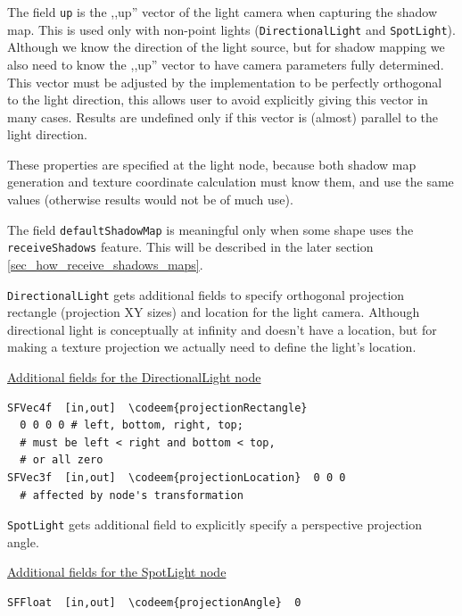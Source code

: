 \documentclass{acmsiggraph}                     %
\newenvironment{mycode}
{\begin{mycodecore}}
{\end{mycodecore}
\vspace{-0.1in}}
\newcommand*{\codeem}[1]{\textbf{#1}}
\begin{document}
The field \texttt{up} is the ,,up'' vector of the light camera when capturing
the shadow map. This is used only with non-point lights
(\texttt{DirectionalLight} and \texttt{SpotLight}).
Although we know the direction of the light source,
but for shadow mapping we also need to know the ,,up'' vector to have camera
parameters fully determined.
This vector must be adjusted by the implementation to be perfectly orthogonal
to the light direction, this allows user to avoid explicitly giving
this vector in many cases. Results are undefined only if this vector
is (almost) parallel to the light direction.

These properties are specified at the light node, because both
shadow map generation and texture coordinate calculation must know them,
and use the same values (otherwise results would not be of much use).

The field \texttt{defaultShadowMap} is meaningful only when some
shape uses the \texttt{receiveShadows} feature. This will be described
in the later section \ref{sec_how_receive_shadows_maps}.

\texttt{DirectionalLight} gets additional fields to specify orthogonal
projection rectangle (projection XY sizes) and location for
the light camera. Although directional light is conceptually at infinity
and doesn't have a location, but for making a texture projection
we actually need to define the light's location.

\begin{mycode}
\underline{Additional fields for the DirectionalLight node}
\begin{Verbatim}[commandchars=\\\{\}]
SFVec4f  [in,out]  \codeem{projectionRectangle}
  0 0 0 0 # left, bottom, right, top;
  # must be left < right and bottom < top,
  # or all zero
SFVec3f  [in,out]  \codeem{projectionLocation}  0 0 0
  # affected by node's transformation
\end{Verbatim}
\end{mycode}

\needspace{1in}
\texttt{SpotLight} gets additional field to explicitly specify a perspective
projection angle.

\begin{mycode}
\underline{Additional fields for the SpotLight node}
\begin{Verbatim}[commandchars=\\\{\}]
SFFloat  [in,out]  \codeem{projectionAngle}  0
\end{Verbatim}
\end{mycode}
\end{document}
